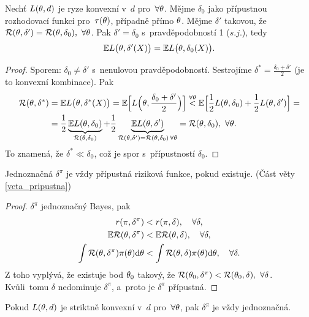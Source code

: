 \begin{theorem}\label{veta_rovnost}
	Nechť $L(\theta,d)$ je ryze konvexní v~$d$ pro~$\forall\theta$. Mějme $\delta_0$ jako přípustnou rozhodovací funkci pro~$\tau(\theta)$, případně přímo $\theta$. Mějme $\delta'$ takovou, že $\mathcal{R}(\theta,\delta')=\mathcal{R}(\theta,\delta_0),~\forall\theta$. Pak $\delta'=\delta_0$ s~pravděpodobností 1 ($s.j.$), tedy $$ \mathbb{E} L\big(\theta,\delta'(X)\big)=\mathbb{E} L\big(\theta,\delta_0(X)\big).$$
	\begin{proof}
		Sporem: $\delta_0\neq\delta'$ s~nenulovou pravděpodobností. Sestrojíme $\delta^\ast=\frac{\delta_0+\delta'}{2}$ (je to konvexní kombinace). Pak
		\[
		\begin{split}
		\mathcal{R}(\theta,\delta^\ast)&=\mathbb{E} L\big(\theta,\delta^\ast(X)\big)=\mathbb{E}\Big[L\Big(\theta,\frac{\delta_0+\delta'}{2}\Big)\Big]\overset{\forall\theta}{<}\mathbb{E}\Big[\frac{1}{2}L(\theta,\delta_0)+\frac{1}{2}L(\theta,\delta')\Big]=\\&= \frac{1}{2}\underbrace{\mathbb{E} L(\theta,\delta_0)}_{\mathcal{R}(\theta,\delta_0)}+\frac{1}{2}\underbrace{\mathbb{E} L(\theta,\delta')}_{\mathcal{R}(\theta,\delta')=\mathcal{R}(\theta,\delta_0)\,\forall\theta}=\mathcal{R}(\theta,\delta_0),~\forall\theta.
		\end{split}
		\] 
		To znamená, že $\delta^\ast\ll\delta_0$, což je spor s~přípustností $\delta_0$.
	\end{proof}
\end{theorem}
\begin{theorem} \label{veta_prip}
	Jednoznačná $\delta^\pi$ je vždy přípustná riziková funkce, pokud existuje. (Část věty \ref{veta_pripustna})
	\begin{proof}
		$\delta^\pi$ jednoznačný Bayes, pak \[
		\begin{split}
		r(\pi,\delta^\pi)&<r(\pi,\delta),\quad\forall\delta,\\
		\mathbb{E} \mathcal{R}(\theta,\delta^\pi)&<\mathbb{E} \mathcal{R}(\theta,\delta),\quad\forall\delta,\\
		\int\mathcal{R}(\theta,\delta^\pi)\pi(\theta)\mathrm{d}\theta&<\int\mathcal{R}(\theta,\delta)\pi(\theta)\mathrm{d}\theta,\quad\forall\delta.		
		\end{split}
		\]
		Z toho vyplývá, že existuje bod $\theta_0$ takový, že  $\mathcal{R}(\theta_0,\delta^\pi)<\mathcal{R}(\theta_0,\delta),~\forall\delta$. Kvůli~tomu $\delta$ nedominuje $\delta^\pi$, a~proto je $\delta^\pi$ přípustná.
	\end{proof}
\end{theorem}
\begin{remark}
	Pokud $L(\theta,d)$ je striktně konvexní v~$d$ pro~$\forall\theta$, pak $\delta^\pi$ je vždy jednoznačná.
\end{remark}
